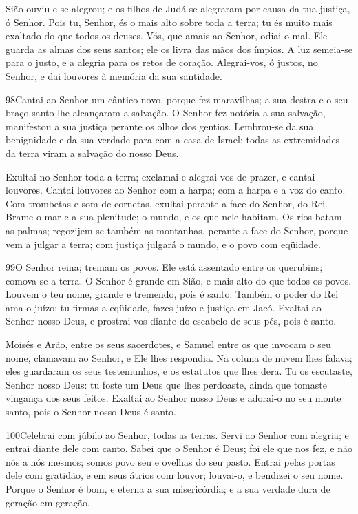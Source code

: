 Sião ouviu e se alegrou; e os filhos de Judá se alegraram por
causa da tua justiça, ó Senhor. Pois tu, Senhor, és o mais alto
sobre toda a terra; tu és muito mais exaltado do que todos os
deuses. Vós, que amais ao Senhor, odiai o mal. Ele guarda as
almas dos seus santos; ele os livra das mãos dos ímpios. A
luz semeia-se para o justo, e a alegria para os retos de coração.
Alegrai-vos, ó justos, no Senhor, e dai louvores à memória da
sua santidade.

\bigskip

\lettrine{98}{}Cantai ao Senhor um cântico novo, porque fez
maravilhas; a sua destra e o seu braço santo lhe alcançaram a
salvação. O Senhor fez notória a sua salvação, manifestou a sua
justiça perante os olhos dos gentios. Lembrou-se da sua
benignidade e da sua verdade para com a casa de Israel; todas as
extremidades da terra viram a salvação do nosso Deus.

Exultai no Senhor toda a terra; exclamai e alegrai-vos de prazer,
e cantai louvores. Cantai louvores ao Senhor com a harpa; com a
harpa e a voz do canto. Com trombetas e som de cornetas, exultai
perante a face do Senhor, do Rei. Brame o mar e a sua plenitude;
o mundo, e os que nele habitam. Os rios batam as palmas;
regozijem-se também as montanhas, perante a face do Senhor,
porque vem a julgar a terra; com justiça julgará o mundo, e o povo
com eqüidade.

\bigskip

\lettrine{99}{}O Senhor reina; tremam os povos. Ele está
assentado entre os querubins; comova-se a terra. O Senhor é
grande em Sião, e mais alto do que todos os povos. Louvem o teu
nome, grande e tremendo, pois é santo. Também o poder do Rei ama
o juízo; tu firmas a eqüidade, fazes juízo e justiça em Jacó.
Exaltai ao Senhor nosso Deus, e prostrai-vos diante do escabelo
de seus pés, pois é santo.

Moisés e Arão, entre os seus sacerdotes, e Samuel entre os que
invocam o seu nome, clamavam ao Senhor, e Ele lhes respondia. Na
coluna de nuvem lhes falava; eles guardaram os seus testemunhos, e
os estatutos que lhes dera. Tu os escutaste, Senhor nosso Deus:
tu foste um Deus que lhes perdoaste, ainda que tomaste vingança dos
seus feitos. Exaltai ao Senhor nosso Deus e adorai-o no seu
monte santo, pois o Senhor nosso Deus é santo.

\bigskip

\lettrine{100}{}Celebrai com júbilo ao Senhor, todas as terras.
Servi ao Senhor com alegria; e entrai diante dele com canto.
Sabei que o Senhor é Deus; foi ele que nos fez, e não nós a nós
mesmos; somos povo seu e ovelhas do seu pasto. Entrai pelas
portas dele com gratidão, e em seus átrios com louvor; louvai-o, e
bendizei o seu nome. Porque o Senhor é bom, e eterna a sua
misericórdia; e a sua verdade dura de geração em geração.

